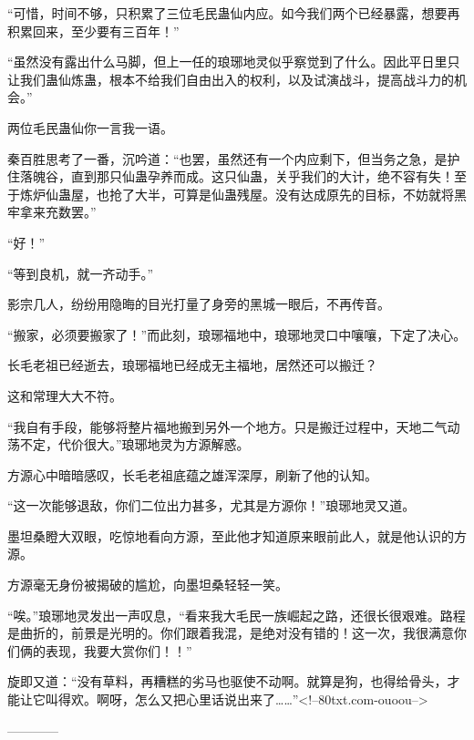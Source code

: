 \begin{this_body}
“可惜，时间不够，只积累了三位毛民蛊仙内应。如今我们两个已经暴露，想要再积累回来，至少要有三百年！”

“虽然没有露出什么马脚，但上一任的琅琊地灵似乎察觉到了什么。因此平日里只让我们蛊仙炼蛊，根本不给我们自由出入的权利，以及试演战斗，提高战斗力的机会。”

两位毛民蛊仙你一言我一语。

秦百胜思考了一番，沉吟道：“也罢，虽然还有一个内应剩下，但当务之急，是护住落魄谷，直到那只仙蛊孕养而成。这只仙蛊，关乎我们的大计，绝不容有失！至于炼炉仙蛊屋，也抢了大半，可算是仙蛊残屋。没有达成原先的目标，不妨就将黑牢拿来充数罢。”

“好！”

“等到良机，就一齐动手。”

影宗几人，纷纷用隐晦的目光打量了身旁的黑城一眼后，不再传音。

“搬家，必须要搬家了！”而此刻，琅琊福地中，琅琊地灵口中嚷嚷，下定了决心。

长毛老祖已经逝去，琅琊福地已经成无主福地，居然还可以搬迁？

这和常理大大不符。

“我自有手段，能够将整片福地搬到另外一个地方。只是搬迁过程中，天地二气动荡不定，代价很大。”琅琊地灵为方源解惑。

方源心中暗暗感叹，长毛老祖底蕴之雄浑深厚，刷新了他的认知。

“这一次能够退敌，你们二位出力甚多，尤其是方源你！”琅琊地灵又道。

墨坦桑瞪大双眼，吃惊地看向方源，至此他才知道原来眼前此人，就是他认识的方源。

方源毫无身份被揭破的尴尬，向墨坦桑轻轻一笑。

“唉。”琅琊地灵发出一声叹息，“看来我大毛民一族崛起之路，还很长很艰难。路程是曲折的，前景是光明的。你们跟着我混，是绝对没有错的！这一次，我很满意你们俩的表现，我要大赏你们！！”

旋即又道：“没有草料，再糟糕的劣马也驱使不动啊。就算是狗，也得给骨头，才能让它叫得欢。啊呀，怎么又把心里话说出来了……”<!--80txt.com-ouoou-->

------------

\end{this_body}

